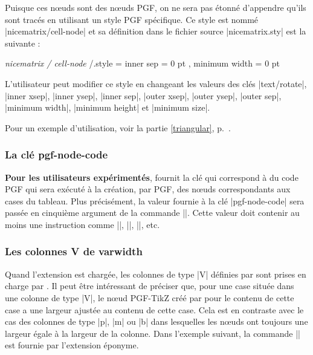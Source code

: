 \documentclass[dvipsnames]{article}%
\begin{document}
\bigskip
Puisque ces nœuds sont des nœuds PGF, on ne sera pas étonné d'appendre qu'ils
sont tracés en utilisant un style PGF spécifique. Ce style est nommé
|nicematrix/cell-node| et sa définition dans le fichier source |nicematrix.sty|
est la suivante :

\begin{Code}
\pgfset 
  { 
    \emph{nicematrix / cell-node} /.style = 
     {
       inner sep = 0 pt ,
       minimum width = 0 pt
     }
  }
\end{Code}

L'utilisateur peut modifier ce style en changeant les valeurs des clés |text/rotate|,
|inner xsep|, |inner ysep|, |inner sep|, |outer xsep|, |outer ysep|, |outer sep|,
|minimum width|, |minimum height| et |minimum size|.

\medskip
Pour un exemple d'utilisation, voir la partie \ref{triangular},
p.~\pageref{triangular}. 

\subsubsection{La clé pgf-node-code}

\textbf{Pour les utilisateurs expérimentés},  fournit la clé
 qui correspond à du code PGF qui sera exécuté à la
création, par PGF, des nœuds correspondants aux cases du tableau. Plus
précisément, la valeur fournie à la clé |pgf-node-code| sera passée en cinquième
argument de la commande |\pgfnode|. Cette valeur doit contenir au moins une
instruction comme |\pgfusepath|, |\pgfusepathqstroke|, |\pgfusepathqfill|, etc.

\subsubsection{Les colonnes V de varwidth}

\label{node-V}

Quand l'extension  est chargée, les colonnes de type |V| définies
par  sont prises en charge par . Il peut être
intéressant de préciser que, pour une case située dans une colonne de type
|V|, le nœud PGF-TikZ créé par  pour le contenu de cette case
a une largeur ajustée au contenu de cette case. Cela est en contraste avec le
cas des colonnes de type |p|, |m| ou |b| dans lesquelles les nœuds ont toujours
une largeur égale à la largeur de la colonne. Dans l'exemple suivant, la
commande |\lipsum| est fournie par l'extension éponyme.
\end{document}
